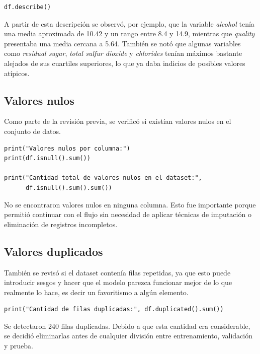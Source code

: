 \documentclass[conference]{IEEEtran}
\begin{document}
\begin{lstlisting}[caption={Descripción estadística básica del dataset}, label={lst:describe}]
df.describe()
\end{lstlisting}

A partir de esta descripción se observó, por ejemplo, que la variable \textit{alcohol} tenía una media aproximada de 10.42 y un rango entre 8.4 y 14.9, mientras que \textit{quality} presentaba una media cercana a 5.64. También se notó que algunas variables como \textit{residual sugar}, \textit{total sulfur dioxide} y \textit{chlorides} tenían máximos bastante alejados de sus cuartiles superiores, lo que ya daba indicios de posibles valores atípicos.

\subsection{Valores nulos}

Como parte de la revisión previa, se verificó si existían valores nulos en el conjunto de datos.

\begin{lstlisting}[caption={Verificación de valores nulos}, label={lst:nulos}]
print("Valores nulos por columna:")
print(df.isnull().sum())

print("Cantidad total de valores nulos en el dataset:",
      df.isnull().sum().sum())
\end{lstlisting}

No se encontraron valores nulos en ninguna columna. Esto fue importante porque permitió continuar con el flujo sin necesidad de aplicar técnicas de imputación o eliminación de registros incompletos.

\subsection{Valores duplicados}

También se revisó si el dataset contenía filas repetidas, ya que esto puede introducir sesgos y hacer que el modelo parezca funcionar mejor de lo que realmente lo hace, es decir un favoritismo a algún elemento.

\begin{lstlisting}[caption={Detección de filas duplicadas}, label={lst:duplicados}]
print("Cantidad de filas duplicadas:", df.duplicated().sum())
\end{lstlisting}

Se detectaron 240 filas duplicadas. Debido a que esta cantidad era considerable, se decidió eliminarlas antes de cualquier división entre entrenamiento, validación y prueba.
\end{document}
